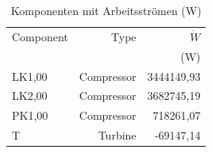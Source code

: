 \begin{longtable}{lrr}
\caption{Komponenten mit Arbeitsströmen (W)} \\
\hline
Component & Type & $\dot W$ \\
 &  & (W) \\
\hline
LK1,00 & Compressor & 3444149,93 \\
LK2,00 & Compressor & 3682745,19 \\
PK1,00 & Compressor & 718261,07 \\
T & Turbine & -69147,14 \\
\hline
\end{longtable}
